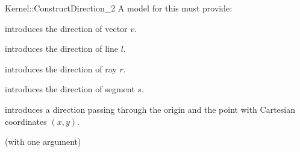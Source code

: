 \begin{ccRefFunctionObjectConcept}{Kernel::ConstructDirection_2}
A model for this must provide:


            {introduces the direction of vector $v$.}

            {introduces the direction of line $l$.}

            {introduces the direction of ray $r$.}

            {introduces the direction of segment $s$.}

\ccHidden{}
            {introduces a direction  passing through the origin
             and the point with Cartesian coordinates $(x, y)$.}

\ccRefines
{} (with one argument)

\ccSeeAlso

  \\

\end{ccRefFunctionObjectConcept}
